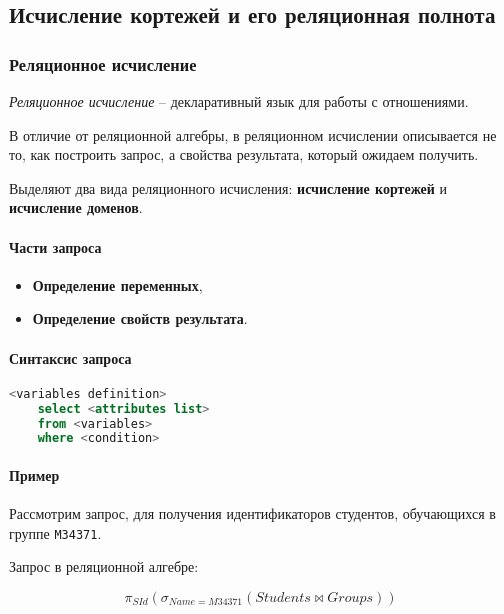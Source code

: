 \subsection{Исчисление кортежей и его реляционная полнота}

\subsubsection{Реляционное исчисление}

\begin{definition}
	\textit{Реляционное исчисление} -- декларативный язык для работы с отношениями.
\end{definition}

В отличие от реляционной алгебры, в реляционном исчислении описывается не то, как построить запрос,
а свойства результата, который ожидаем получить.

Выделяют два вида реляционного исчисления: \textbf{исчисление кортежей} и \textbf{исчисление доменов}.

\paragraph{Части запроса}

\begin{itemize}
	\item \textbf{Определение переменных},
	\item \textbf{Определение свойств результата}.
\end{itemize}

\paragraph{Синтаксис запроса}

\begin{lstlisting}[language=SQL]
    <variables definition>
    select <attributes list>
    from <variables>
    where <condition>
\end{lstlisting}

\paragraph{Пример}

Рассмотрим запрос, для получения идентификаторов студентов, обучающихся в группе
\texttt{M34371}.

Запрос в реляционной алгебре:

\[
	\pi_{SId}(\sigma_{Name = M34371} (Students \bowtie Groups))
\]

